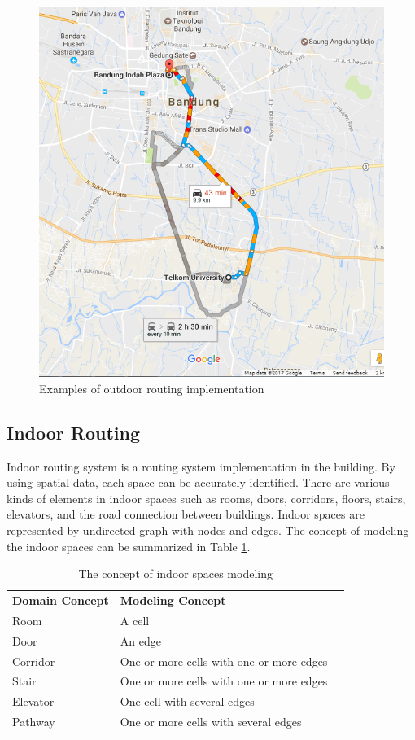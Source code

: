 \begin{figure}[h!]
	\centering
	\includegraphics[scale=0.4]{figure4a.png}
	\caption{Examples of outdoor routing implementation}
	\label{fig:figure4}
\end{figure}

\subsection{Indoor Routing}
Indoor routing system is a routing system implementation in the building. By using spatial data, each space can be accurately identified. There are various kinds of elements in indoor spaces such as rooms, doors, corridors, floors, stairs, elevators, and the road connection between buildings. Indoor spaces are represented by undirected graph with nodes and edges. The concept of modeling the indoor spaces can be summarized in Table \ref{indoor-concept-table}.

\begin{table}[h!]
	\centering
	\caption{The concept of indoor spaces modeling \cite{alamri2014adjacency}} %
	\label{indoor-concept-table}
	\begin{tabular}{|l|l|l}
		\cline{1-2}
		\textbf{Domain Concept} & \textbf{Modeling Concept}   &  \\ \cline{1-2}
		Room		&	A cell &  \\ \cline{1-2}
		Door		&	An edge  &  \\ \cline{1-2}
		Corridor	&	One or more cells with one or more edges &  \\ \cline{1-2}
		Stair		&	One or more cells with one or more edges &  \\ \cline{1-2}
		Elevator	&	One cell with several edges &  \\ \cline{1-2}
		Pathway		&	One or more cells with several edges &  \\ \cline{1-2}
	\end{tabular}
\end{table}

